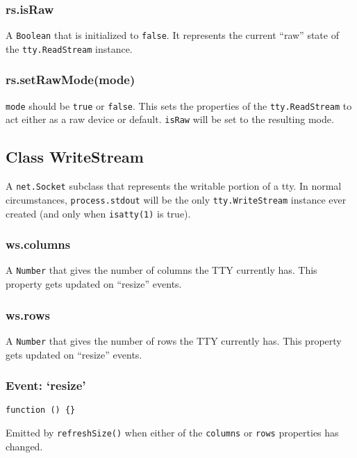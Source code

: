\subsubsection{rs.isRaw}

A \texttt{Boolean} that is initialized to \texttt{false}. It represents
the current ``raw'' state of the \texttt{tty.ReadStream} instance.

\subsubsection{rs.setRawMode(mode)}

\texttt{mode} should be \texttt{true} or \texttt{false}. This sets the
properties of the \texttt{tty.ReadStream} to act either as a raw device
or default. \texttt{isRaw} will be set to the resulting mode.

\subsection{Class WriteStream}

A \texttt{net.Socket} subclass that represents the writable portion of a
tty. In normal circumstances, \texttt{process.stdout} will be the only
\texttt{tty.WriteStream} instance ever created (and only when
\texttt{isatty(1)} is true).

\subsubsection{ws.columns}

A \texttt{Number} that gives the number of columns the TTY currently
has. This property gets updated on ``resize'' events.

\subsubsection{ws.rows}

A \texttt{Number} that gives the number of rows the TTY currently has.
This property gets updated on ``resize'' events.

\subsubsection{Event: `resize'}

\texttt{function () \{\}}

Emitted by \texttt{refreshSize()} when either of the \texttt{columns} or
\texttt{rows} properties has changed.

